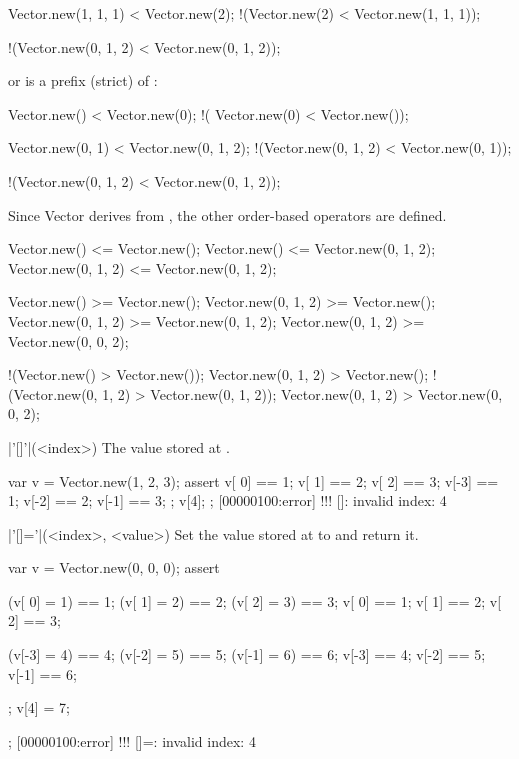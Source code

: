 \begin{urbiscriptapi}
\begin{urbiassert}
   Vector.new(1, 1, 1) < Vector.new(2);
 !(Vector.new(2)       < Vector.new(1, 1, 1));

 !(Vector.new(0, 1, 2) < Vector.new(0, 1, 2));
\end{urbiassert}

  \noindent
  or \that is a prefix (strict) of \this:

\begin{urbiassert}
           Vector.new() < Vector.new(0);
  !(      Vector.new(0) < Vector.new());

       Vector.new(0, 1) < Vector.new(0, 1, 2);
  !(Vector.new(0, 1, 2) < Vector.new(0, 1));

  !(Vector.new(0, 1, 2) < Vector.new(0, 1, 2));
\end{urbiassert}

Since Vector derives from , the other order-based
operators are defined.

\begin{urbiassert}
        Vector.new() <= Vector.new();
        Vector.new() <= Vector.new(0, 1, 2);
 Vector.new(0, 1, 2) <= Vector.new(0, 1, 2);

        Vector.new() >= Vector.new();
 Vector.new(0, 1, 2) >= Vector.new();
 Vector.new(0, 1, 2) >= Vector.new(0, 1, 2);
 Vector.new(0, 1, 2) >= Vector.new(0, 0, 2);

       !(Vector.new() > Vector.new());
  Vector.new(0, 1, 2) > Vector.new();
!(Vector.new(0, 1, 2) > Vector.new(0, 1, 2));
  Vector.new(0, 1, 2) > Vector.new(0, 0, 2);
\end{urbiassert}

\item|'[]'|(<index>)%
  The value stored at .
\begin{urbiscript}
{
  var v = Vector.new(1, 2, 3);
  assert
  {
    v[ 0] == 1; v[ 1] == 2; v[ 2] == 3;
    v[-3] == 1; v[-2] == 2; v[-1] == 3;
  };
  v[4];
};
[00000100:error] !!! []: invalid index: 4
\end{urbiscript}

\item|'[]='|(<index>, <value>)%
  Set the value stored at  to  and return it.
\begin{urbiscript}
{
  var v = Vector.new(0, 0, 0);
  assert
  {
    (v[ 0] = 1) == 1; (v[ 1] = 2) == 2; (v[ 2] = 3) == 3;
     v[ 0]      == 1;  v[ 1]      == 2;  v[ 2]      == 3;

    (v[-3] = 4) == 4; (v[-2] = 5) == 5; (v[-1] = 6) == 6;
     v[-3]      == 4;  v[-2]      == 5;  v[-1]      == 6;
  };
  v[4] = 7;
};
[00000100:error] !!! []=: invalid index: 4
\end{urbiscript}
\end{urbiscriptapi}

